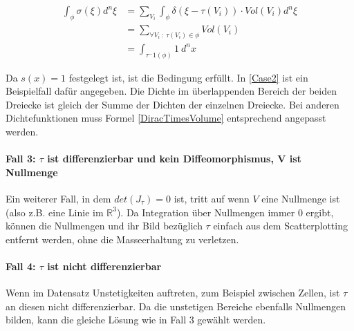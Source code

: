 \documentclass[a4paper,fontsize=12pt,toc=bib,halfparskip]{scrartcl}
\begin{document}
\begin{equation}
\begin{split}
\int_{\phi}\sigma(\xi)d^n\xi &= \sum_{V_i}\int_{\phi}\delta(\xi - \tau(V_i)) \cdot Vol(V_i)d^n\xi\\
&= \sum_{\forall V_i~:~\tau(V_i)\in \phi} Vol(V_i)\\
&= \int_{\tau^-1(\phi)}1~d^nx
\end{split}
\end{equation}

Da $s(x) = 1$ festgelegt ist, ist die Bedingung erf\"ullt. In \ref{Case2} ist ein Beispielfall daf\"ur angegeben. Die Dichte im \"uberlappenden Bereich der beiden Dreiecke ist gleich der Summe der Dichten der einzelnen Dreiecke. Bei anderen Dichtefunktionen muss Formel \ref{DiracTimesVolume} entsprechend angepasst werden.

\paragraph{Fall 3: $\tau$ ist differenzierbar und kein Diffeomorphismus, V ist Nullmenge}
Ein weiterer Fall, in dem $det(J_\tau) = 0$ ist, tritt auf wenn $V$ eine Nullmenge ist (also z.B. eine Linie im $\mathbb{R}^3$). Da Integration \"uber Nullmengen immer 0 ergibt, k\"onnen die Nullmengen und ihr Bild bez\"uglich $\tau$ einfach aus dem Scatterplotting entfernt werden, ohne die Masseerhaltung zu verletzen.

\paragraph{Fall 4: $\tau$ ist nicht differenzierbar}
Wenn im Datensatz Unstetigkeiten auftreten, zum Beispiel zwischen Zellen, ist $\tau$ an diesen nicht differenzierbar. Da die unstetigen Bereiche ebenfalls Nullmengen bilden, kann die gleiche L\"osung wie in Fall 3 gew\"ahlt werden.
\end{document}
